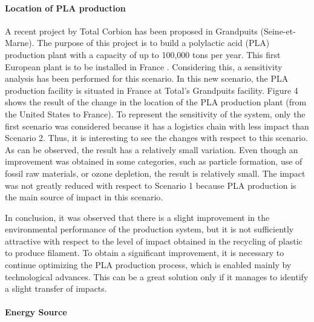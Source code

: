 \documentclass[]{elsarticle} %
\begin{document}
\hypertarget{location-of-pla-production}{%
\paragraph{Location of PLA production}\label{location-of-pla-production}}

A recent project by Total Corbion has been proposed in Grandpuits (Seine-et-Marne). The purpose of this project is to build a polylactic acid (PLA) production plant with a capacity of up to 100,000 tons per year. This first European plant is to be installed in France . Considering this, a sensitivity analysis has been performed for this scenario. In this new scenario, the PLA production facility is situated in France at Total's Grandpuits facility.
Figure 4 shows the result of the change in the location of the PLA production plant (from the United States to France). To represent the sensitivity of the system, only the first scenario was considered because it has a logistics chain with less impact than Scenario 2. Thus, it is interesting to see the changes with respect to this scenario. As can be observed, the result has a relatively small variation. Even though an improvement was obtained in some categories, such as particle formation, use of fossil raw materials, or ozone depletion, the result is relatively small. The impact was not greatly reduced with respect to Scenario 1 because PLA production is the main source of impact in this scenario.

In conclusion, it was observed that there is a slight improvement in the environmental performance of the production system, but it is not sufficiently attractive with respect to the level of impact obtained in the recycling of plastic to produce filament. To obtain a significant improvement, it is necessary to continue optimizing the PLA production process, which is enabled mainly by technological advances. This can be a great solution only if it manages to identify a slight transfer of impacts.

\hypertarget{energy-source}{%
\paragraph{Energy Source}\label{energy-source}}
\end{document}
